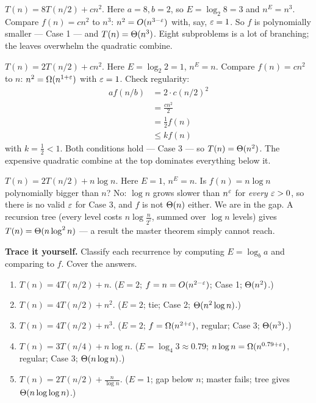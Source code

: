 \begin{example}
$T(n)=8T(n/2)+cn^2$. Here $a=8,b=2$, so $E=\log_2 8 = 3$ and $n^{E}=n^3$. Compare
$f(n)=cn^2$ to $n^3$: $n^2 = O(n^{3-\varepsilon})$ with, say, $\varepsilon=1$. So $f$ is
polynomially smaller --- Case 1 --- and $T(n)=\Theta(n^3)$. Eight subproblems is a
lot of branching; the leaves overwhelm the quadratic combine.
\end{example}

\begin{example}
$T(n)=2T(n/2)+cn^2$. Here $E=\log_2 2 = 1$, $n^{E}=n$. Compare $f(n)=cn^2$ to $n$:
$n^2=\Omega(n^{1+\varepsilon})$ with $\varepsilon=1$. Check regularity:
\begin{align*}
a f(n/b) &= 2\cdot c(n/2)^2 \\
         &= \frac{c n^2}{2} \\
         &= \frac{1}{2} f(n) \\
         &\le k f(n)
\end{align*}
with $k=\tfrac12 < 1$. Both conditions hold --- Case 3 --- so $T(n)=\Theta(n^2)$. The
expensive quadratic combine at the top dominates everything below it.
\end{example}

\begin{example}
$T(n)=2T(n/2)+n\log n$. Here $E=1$, $n^{E}=n$. Is $f(n)=n\log n$ polynomially
bigger than $n$? No: $\log n$ grows slower than $n^{\varepsilon}$ for \emph{every}
$\varepsilon>0$, so there is no valid $\varepsilon$ for Case 3, and $f$ is not $\Theta(n)$ either.
We are in the gap. A recursion tree (every level costs $n\log\frac{n}{2^i}$,
summed over $\log n$ levels) gives $T(n)=\Theta(n\log^2 n)$ --- a result the master
theorem simply cannot reach.
\end{example}

\begin{labbox}
\textbf{Trace it yourself.} Classify each recurrence by computing $E=\log_b a$ and
comparing to $f$. Cover the answers.
\begin{enumerate}
\item $T(n)=4T(n/2)+n$. \hfill ($E=2$; $f=n=O(n^{2-\varepsilon})$; Case 1; $\Theta(n^2)$.)
\item $T(n)=4T(n/2)+n^2$. \hfill ($E=2$; tie; Case 2; $\Theta(n^2\log n)$.)
\item $T(n)=4T(n/2)+n^3$. \hfill ($E=2$; $f=\Omega(n^{2+\varepsilon})$, regular; Case 3;
      $\Theta(n^3)$.)
\item $T(n)=3T(n/4)+n\log n$. \hfill ($E=\log_4 3\approx 0.79$;
      $n\log n=\Omega(n^{0.79+\varepsilon})$, regular; Case 3; $\Theta(n\log n)$.)
\item $T(n)=2T(n/2)+\tfrac{n}{\log n}$. \hfill ($E=1$; gap below $n$;
      master fails; tree gives $\Theta(n\log\log n)$.)
\end{enumerate}
\end{labbox}

